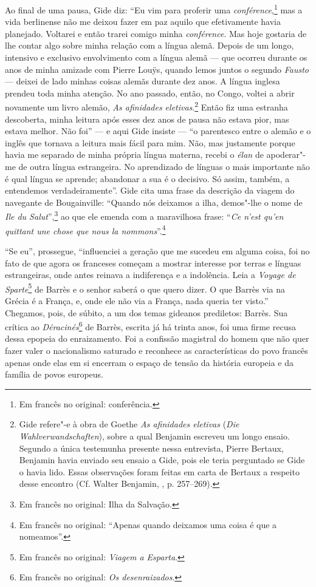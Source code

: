 Ao final de uma pausa, Gide diz: ``Eu vim para proferir uma
\emph{conférence},\footnote{Em francês no original: conferência. \versal{[N.~T.]}} mas a vida
berlinense não me deixou fazer em paz aquilo que efetivamente havia
planejado. Voltarei e então trarei comigo minha \emph{conférence}. Mas
hoje gostaria de lhe contar algo sobre minha relação com a língua alemã.
Depois de um longo, intensivo e exclusivo envolvimento com a língua
alemã --- que ocorreu durante os anos de minha amizade com Pierre Louÿs,
quando lemos juntos o segundo \emph{Fausto} --- deixei de lado minhas
coisas alemãs durante dez anos. A língua inglesa prendeu toda minha
atenção. No ano passado, então, no Congo, voltei a abrir novamente um
livro alemão, \emph{As afinidades eletivas}.\footnote{Gide
  refere"-e à obra de Goethe \emph{As afinidades eletivas} (\emph{Die
  Wahlverwandschaften}), sobre a qual Benjamin escreveu um longo ensaio.
  Segundo a única testemunha presente nessa entrevista, Pierre Bertaux,
  Benjamin havia enviado seu ensaio a Gide, pois ele teria perguntado se
  Gide o havia lido. Essas observações foram feitas em carta de Bertaux
  a respeito desse encontro (Cf. Walter Benjamin, ,
  p. 257--269). \versal{[N.~T.]}} Então fiz uma estranha descoberta, minha leitura após esses
dez anos de pausa não estava pior, mas estava melhor. Não foi'' --- e aqui
Gide insiste --- ``o parentesco entre o alemão e o inglês que tornava a
leitura mais fácil para mim. Não, mas justamente porque havia me
separado de minha própria língua materna, recebi o \emph{élan} de
apoderar"-me de outra língua estrangeira. No aprendizado de línguas o
mais importante não é qual língua se aprende; abandonar a sua é o
decisivo. Só assim, também, a entendemos verdadeiramente''. Gide cita
uma frase da descrição da viagem do navegante de Bougainville: ``Quando
nós deixamos a ilha, demos"-lhe o nome de \emph{Ile du Salut}'',\footnote{Em francês no original: Ilha da Salvação. \versal{[N.~T.]}} ao que ele emenda com a maravilhosa
frase: ``\emph{Ce n'est qu'en quittant une chose que nous la
nommons}''.\footnote{Em francês no original: ``Apenas quando deixamos uma coisa é que a
  nomeamos''. \versal{[N.~T.]}}

``Se eu'', prossegue, ``influenciei a geração que me sucedeu em alguma
coisa, foi no fato de que agora os franceses começam a mostrar interesse
por terras e línguas estrangeiras, onde antes reinava a indiferença e a
indolência. Leia a \emph{Voyage de Sparte}\footnote{Em francês no original: \emph{Viagem
  a Esparta}. \versal{[N.~T.]}} de Barrès e o senhor saberá o que quero dizer. O que
Barrès via na Grécia é a França, e, onde ele não via a França, nada
queria ter visto.'' Chegamos, pois, de súbito, a um dos temas gideanos
prediletos: Barrès. Sua crítica ao \emph{Déracinés}\footnote{Em francês no original: \emph{Os desenraizados}. \versal{[N.~T.]}} de Barrès, escrita já há trinta anos, foi uma firme recusa dessa
epopeia do enraizamento. Foi a confissão magistral do homem que não quer
fazer valer o nacionalismo saturado e reconhece as características do
povo francês apenas onde elas em si encerram o espaço de tensão da
história europeia e da família de povos europeus.

